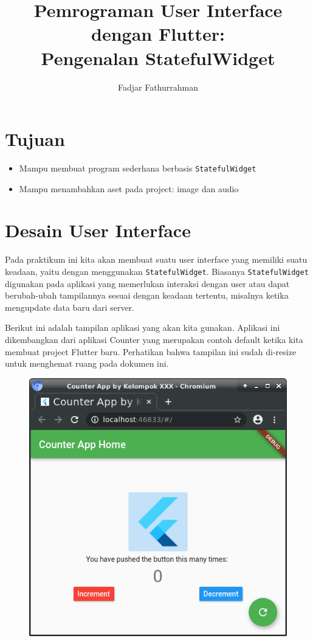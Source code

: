 \documentclass[a4paper,11pt]{article} %
\newcommand{\txtinline}[1]{\texttt{#1}}
\begin{document}
\title{Pemrograman User Interface dengan Flutter:\\
Pengenalan StatefulWidget}
\author{Fadjar Fathurrahman}
\date{}
\maketitle

\section{Tujuan}

\begin{itemize}
\item Mampu membuat program sederhana berbasis \txtinline{StatefulWidget}
\item Mampu menambahkan aset pada project: image dan audio
\end{itemize}

\section{Desain User Interface}
Pada praktikum ini kita akan membuat suatu user interface yang memiliki
suatu keadaan, yaitu dengan menggunakan \txtinline{StatefulWidget}.
Biasanya \txtinline{StatefulWidget} digunakan pada aplikasi yang memerlukan
interaksi dengan user atau dapat berubah-ubah tampilannya sesuai dengan
keadaan tertentu, misalnya ketika mengupdate data baru dari server.

Berikut ini adalah tampilan aplikasi yang akan kita gunakan.
Aplikasi ini dikembangkan dari aplikasi Counter yang merupakan
contoh default ketika kita membuat project Flutter baru. Perhatikan
bahwa tampilan ini sudah di-resize untuk menghemat ruang pada dokumen ini.
\begin{figure}[h]
{\centering
\includegraphics[scale=0.5]{images/counter_app_v2.png}
\par}
\end{figure}
\end{document}
